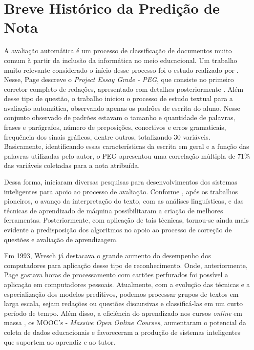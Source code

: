 \section{Breve Histórico da Predição de Nota}
A avaliação automática é um processo de classificação de documentos muito comum à partir da inclusão da informática no meio educacional. Um trabalho muito relevante considerado o início desse processo foi o estudo realizado por . Nesse, Page descreve o \textit{Project Essay Grade - PEG}, que consiste no primeiro corretor completo de redações, apresentado com detalhes posteriormente \cite{page1968}. Além desse tipo de questão, o trabalho iniciou o processo de estudo textual para a avaliação automática, observando apenas os padrões de escrita do aluno. Nesse conjunto observado de padrões estavam o tamanho e quantidade de palavras, frases e parágrafos, número de preposições, conectivos e erros gramaticais, frequência dos sinais gráficos, dentre outros, totalizando 30 variáveis. Basicamente, identificando essas características da escrita em geral e a função das palavras utilizadas pelo autor, o PEG apresentou uma correlação múltipla de 71\% das variáveis coletadas para a nota atribuída.

Dessa forma, iniciaram diversas pesquisas para desenvolvimentos dos sistemas inteligentes para apoio ao processo de avaliação. Conforme , após os trabalhos pioneiros, o avanço da interpretação do texto, com as análises linguísticas, e das técnicas de aprendizado de máquina possibilitaram a criação de melhores ferramentas. Posteriormente, com aplicação de tais técnicas, tornou-se ainda mais evidente a predisposição dos algoritmos no apoio ao processo de correção de questões e avaliação de aprendizagem.

Em 1993, Wresch já destacava o grande aumento do desempenho dos computadores para aplicação desse tipo de reconhecimento. Onde, anteriormente, Page gastava horas de processamento com cartões perfurados foi possível a aplicação em computadores pessoais. Atualmente, com a evolução das técnicas e a especialização dos modelos preditivos, podemos processar grupos de textos em larga escala, sejam redações ou questões discursivas e classificá-las em um curto período de tempo. Além disso, a eficiência do aprendizado nos cursos \textit{online} em massa \cite{gamage2016}, os MOOC's - \textit{Massive Open Online Courses}, aumentaram o potencial da coleta de dados educacionais e favoreceram a produção de sistemas inteligentes que suportem ao aprendiz e ao tutor.

